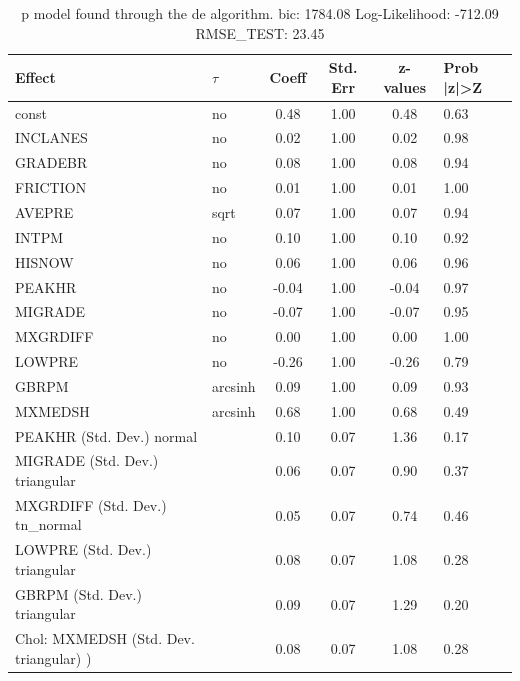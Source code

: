 \begin{table}
	\caption{p model found through the de algorithm. bic: 1784.08 Log-Likelihood: -712.09 RMSE_TEST: 23.45}
	\begin{center}
		\begin{tabular}{|l|l|c|c|c|l|}
			\hline
			Effect & $\tau$ & Coeff & Std. Err & z-values & Prob |z|>Z \\
			\hline
			const & no & 0.48 & 1.00 & 0.48 & 0.63 \\
			\hline
			INCLANES & no & 0.02 & 1.00 & 0.02 & 0.98 \\
			\hline
			GRADEBR & no & 0.08 & 1.00 & 0.08 & 0.94 \\
			\hline
			FRICTION & no & 0.01 & 1.00 & 0.01 & 1.00 \\
			\hline
			AVEPRE & sqrt & 0.07 & 1.00 & 0.07 & 0.94 \\
			\hline
			INTPM & no & 0.10 & 1.00 & 0.10 & 0.92 \\
			\hline
			HISNOW & no & 0.06 & 1.00 & 0.06 & 0.96 \\
			\hline
			PEAKHR & no & -0.04 & 1.00 & -0.04 & 0.97 \\
			\hline
			MIGRADE & no & -0.07 & 1.00 & -0.07 & 0.95 \\
			\hline
			MXGRDIFF & no & 0.00 & 1.00 & 0.00 & 1.00 \\
			\hline
			LOWPRE & no & -0.26 & 1.00 & -0.26 & 0.79 \\
			\hline
			GBRPM & arcsinh & 0.09 & 1.00 & 0.09 & 0.93 \\
			\hline
			MXMEDSH & arcsinh & 0.68 & 1.00 & 0.68 & 0.49 \\
			\hline
			PEAKHR (Std. Dev.) normal &  & 0.10 & 0.07 & 1.36 & 0.17 \\
			\hline
			MIGRADE (Std. Dev.) triangular &  & 0.06 & 0.07 & 0.90 & 0.37 \\
			\hline
			MXGRDIFF (Std. Dev.) tn_normal &  & 0.05 & 0.07 & 0.74 & 0.46 \\
			\hline
			LOWPRE (Std. Dev.) triangular &  & 0.08 & 0.07 & 1.08 & 0.28 \\
			\hline
			GBRPM (Std. Dev.) triangular &  & 0.09 & 0.07 & 1.29 & 0.20 \\
			\hline
			 Chol: MXMEDSH (Std. Dev. triangular) ) &  & 0.08 & 0.07 & 1.08 & 0.28 \\
			\hline
		\end{tabular}
	\end{center}
\end{table}